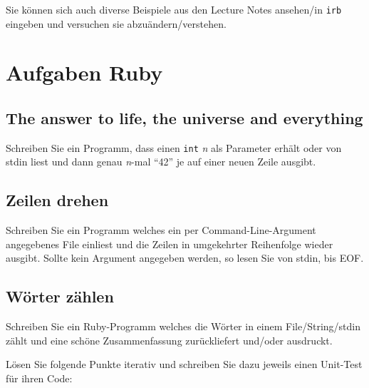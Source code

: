 \documentclass[a4paper,11pt,oneside]{scrbook}
\begin{document}
Sie können sich auch diverse Beispiele aus den Lecture Notes ansehen/in \texttt{irb} eingeben und versuchen sie abzuändern/verstehen.








\chapter{Aufgaben Ruby} %
\label{cha:Aufgaben Ruby}


\section{The answer to life, the universe and everything} %
\label{sec:the_answer_to_life_the_universe_and_everything}
Schreiben Sie ein Programm, dass einen \texttt{int} \emph{n} als Parameter erhält oder von stdin liest und dann genau \emph{n}-mal “42” je auf einer neuen Zeile ausgibt.



\section{Zeilen drehen} %
\label{sec:Zeilen drehen}
Schreiben Sie ein Programm welches ein per Command-Line-Argument angegebenes File einliest und die Zeilen in umgekehrter Reihenfolge wieder ausgibt.
Sollte kein Argument angegeben werden, so lesen Sie von stdin, bis EOF.


\section{Wörter zählen} %
\label{sec:Wörter zählen}
Schreiben Sie ein Ruby-Programm welches die Wörter in einem File/String/stdin zählt und eine schöne Zusammenfassung zurückliefert und/oder ausdruckt.

Lösen Sie folgende Punkte iterativ und schreiben Sie dazu jeweils einen Unit-Test für ihren Code:
\end{document}

